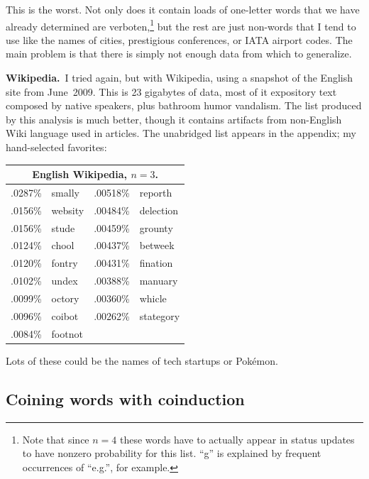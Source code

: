 \documentclass[twocolumn]{article}
\begin{document}
This is the worst. Not only does it contain loads of one-letter words that
we have already determined are verboten,\!\footnote{Note that since $n=4$ these
words have to actually appear in status updates to have nonzero probability for
this list. ``g'' is explained by frequent occurrences of ``e.g.'', for example.}
but the rest are just non-words that I tend to use like the names of cities,
prestigious conferences, or IATA airport codes. The main problem is that there
is simply not enough data from which to generalize.

{\bf Wikipedia.}\ I tried again, but with Wikipedia, using a snapshot
of the English site from June~2009. This is 23 gigabytes of data, most
of it expository text composed by native speakers, plus bathroom humor
vandalism. The list produced by this analysis is much better, though it
contains artifacts from non-English Wiki language used in articles. The
unabridged list appears in the appendix; my hand-selected favorites:

\begin{center}
\begin{tabular}{rl@{\quad\quad}rl}
\multicolumn{4}{c}{English Wikipedia, $n=3$.}     \\
\hline
.0287\% & smally      &     .00518\% & reporth    \\
.0156\% & websity     &     .00484\% & delection  \\
.0156\% & stude       &     .00459\% & grounty    \\
.0124\% & chool       &     .00437\% & betweek    \\
.0120\% & fontry      &     .00431\% & fination   \\
.0102\% & undex       &     .00388\% & manuary    \\
.0099\% & octory      &     .00360\% & whicle     \\
.0096\% & coibot      &     .00262\% & stategory  \\
.0084\% & footnot     &                           \\
\end{tabular}
\end{center}







Lots of these could be the names of tech startups or Pok\'emon.


\subsection{Coining words with coinduction} \label{sec:coin}
\end{document}
